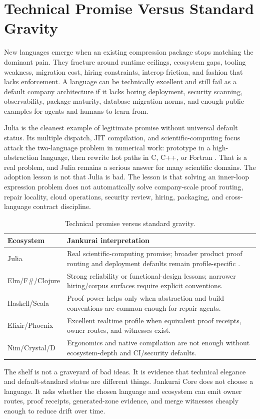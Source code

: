 \section{Technical Promise Versus Standard Gravity}

New languages emerge when an existing compression package stops matching the dominant pain. They fracture around runtime ceilings, ecosystem gaps, tooling weakness, migration cost, hiring constraints, interop friction, and fashion that lacks enforcement. A language can be technically excellent and still fail as a default company architecture if it lacks boring deployment, security scanning, observability, package maturity, database migration norms, and enough public examples for agents and humans to learn from.

Julia is the cleanest example of legitimate promise without universal default status. Its multiple dispatch, JIT compilation, and scientific-computing focus attack the two-language problem in numerical work: prototype in a high-abstraction language, then rewrite hot paths in C, C++, or Fortran \cite{bezansonJulia2017}. That is a real problem, and Julia remains a serious answer for many scientific domains. The adoption lesson is not that Julia is bad. The lesson is that solving an inner-loop expression problem does not automatically solve company-scale proof routing, repair locality, cloud operations, security review, hiring, packaging, and cross-language contract discipline.

\begin{table}[t]
\caption{Technical promise versus standard gravity.}
\label{tab:standard-gravity}
\centering
\scriptsize
\begin{tabularx}{\columnwidth}{L{0.24\columnwidth} Y}
\toprule
\textbf{Ecosystem} & \textbf{Jankurai interpretation} \\
\midrule
Julia & Real scientific-computing promise; broader product proof routing and deployment defaults remain profile-specific \cite{bezansonJulia2017}. \\
Elm/F\#/Clojure & Strong reliability or functional-design lessons; narrower hiring/corpus surfaces require explicit conventions. \\
Haskell/Scala & Proof power helps only when abstraction and build conventions are common enough for repair agents. \\
Elixir/Phoenix & Excellent realtime profile when equivalent proof receipts, owner routes, and witnesses exist. \\
Nim/Crystal/D & Ergonomics and native compilation are not enough without ecosystem-depth and CI/security defaults. \\
\bottomrule
\end{tabularx}
\end{table}

The shelf is not a graveyard of bad ideas. It is evidence that technical elegance and default-standard status are different things. Jankurai Core does not choose a language. It asks whether the chosen language and ecosystem can emit owner routes, proof receipts, generated-zone evidence, and merge witnesses cheaply enough to reduce drift over time.
